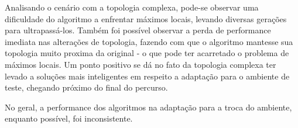 Analisando o cen{\'a}rio com a topologia
complexa, pode-se observar uma dificuldade do
algoritmo a enfrentar m{\'a}ximos locais,
levando diversas gera{\c c}{\~o}es para
ultrapass{\'a}-los. Tamb{\'e}m foi possível
observar a perda de performance imediata nas
altera{\c c}{\~o}es de topologia, fazendo com
que o algoritmo mantesse sua topologia muito
proxima da original - o que pode ter acarretado
o problema de m{\'a}ximos locais. Um ponto
positivo se dá no fato da topologia complexa ter levado a
solu{\c c}{\~o}es mais inteligentes em respeito
a adapta{\c c}{\~a}o para o ambiente de teste,
chegando pr{\'o}ximo do final do percurso.

No geral, a performance dos algoritmos na
adapta{\c c}{\~a}o para a troca do ambiente,
enquanto poss{\'i}vel, foi inconsistente.

